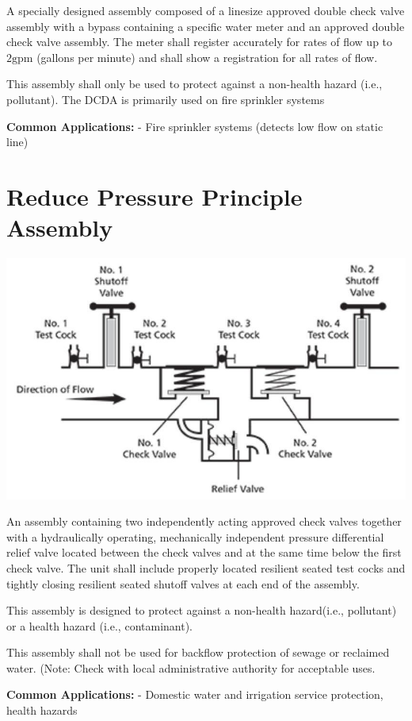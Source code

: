 \documentclass[10pt]{article}
\begin{document}
A specially designed assembly composed of a linesize approved double check valve assembly with a bypass containing a specific water meter and an approved double check valve assembly. The meter shall register accurately for rates of flow up to $2 \mathrm{gpm}$ (gallons per minute) and shall show a registration for all rates of flow.

This assembly shall only be used to protect against a non-health hazard (i.e., pollutant). The DCDA is primarily used on fire sprinkler systems

\textbf{Common Applications: } - Fire sprinkler systems (detects low flow on static line)
\newpage
\section{Reduce Pressure Principle Assembly}
\includegraphics[max width=\textwidth]{ReducedPressurePrinciple}

An assembly containing two independently acting approved check valves together with a hydraulically operating, mechanically independent pressure differential relief valve located between the check valves and at the same time below the first check valve. The unit shall include properly located resilient seated test cocks and tightly closing resilient seated shutoff valves at each end of the assembly.

This assembly is designed to protect against a non-health hazard(i.e., pollutant) or a health hazard (i.e., contaminant).

This assembly shall not be used for backflow protection of sewage or reclaimed water. (Note: Check with local administrative authority for acceptable uses.

\textbf{Common Applications: } - Domestic water and irrigation service protection, health hazards
\newpage
\end{document}
